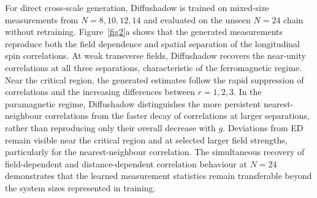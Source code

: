 \documentclass[pdflatex,sn-nature]{sn-jnl}%
\theoremstyle{thmstyleone}%
\theoremstyle{thmstyletwo}%
\theoremstyle{thmstylethree}%
\begin{document}
For direct cross-scale generation, Diffushadow is trained on mixed-size measurements from $N=8,10,12,14$ and evaluated on the unseen $N=24$ chain without retraining. Figure~\ref{fig2}a shows that the generated measurements reproduce both the field dependence and spatial separation of the longitudinal spin correlations. At weak transverse fields, Diffushadow recovers the near-unity correlations at all three separations, characteristic of the ferromagnetic regime. Near the critical region, the generated estimates follow the rapid suppression of correlations and the increasing differences between $r=1,2,3$. In the paramagnetic regime, Diffushadow distinguishes the more persistent nearest-neighbour correlations from the faster decay of correlations at larger separations, rather than reproducing only their overall decrease with $g$. Deviations from ED remain visible near the critical region and at selected larger field strengths, particularly for the nearest-neighbour correlation. The simultaneous recovery of field-dependent and distance-dependent correlation behaviour at $N=24$ demonstrates that the learned measurement statistics remain transferable beyond the system sizes represented in training.





\end{document}
